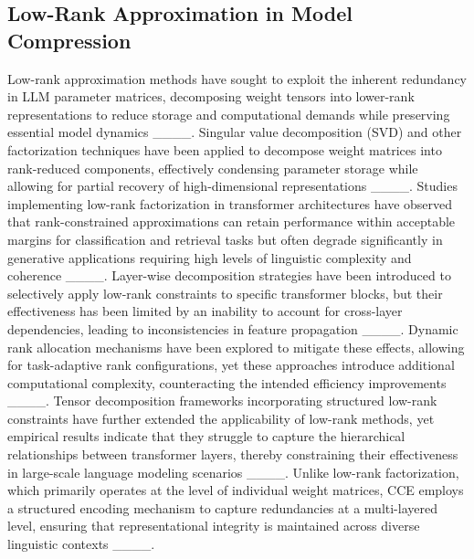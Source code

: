 \subsection{Low-Rank Approximation in Model Compression}
Low-rank approximation methods have sought to exploit the inherent redundancy in LLM parameter matrices, decomposing weight tensors into lower-rank representations to reduce storage and computational demands while preserving essential model dynamics ____. Singular value decomposition (SVD) and other factorization techniques have been applied to decompose weight matrices into rank-reduced components, effectively condensing parameter storage while allowing for partial recovery of high-dimensional representations ____. Studies implementing low-rank factorization in transformer architectures have observed that rank-constrained approximations can retain performance within acceptable margins for classification and retrieval tasks but often degrade significantly in generative applications requiring high levels of linguistic complexity and coherence ____. Layer-wise decomposition strategies have been introduced to selectively apply low-rank constraints to specific transformer blocks, but their effectiveness has been limited by an inability to account for cross-layer dependencies, leading to inconsistencies in feature propagation ____. Dynamic rank allocation mechanisms have been explored to mitigate these effects, allowing for task-adaptive rank configurations, yet these approaches introduce additional computational complexity, counteracting the intended efficiency improvements ____. Tensor decomposition frameworks incorporating structured low-rank constraints have further extended the applicability of low-rank methods, yet empirical results indicate that they struggle to capture the hierarchical relationships between transformer layers, thereby constraining their effectiveness in large-scale language modeling scenarios ____. Unlike low-rank factorization, which primarily operates at the level of individual weight matrices, CCE employs a structured encoding mechanism to capture redundancies at a multi-layered level, ensuring that representational integrity is maintained across diverse linguistic contexts ____.

